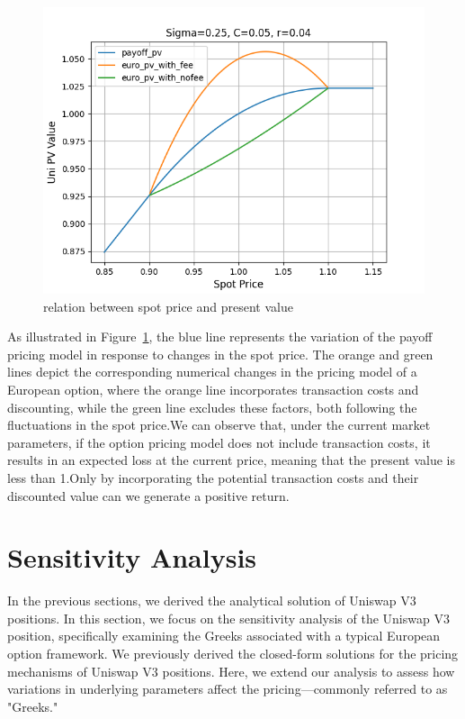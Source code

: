 \documentclass[conference]{IEEEtran}
\begin{document}
\begin{figure}
    \centering
    \includegraphics[width=1\linewidth]{figures/euro-pv-spot.png}
    \caption{relation between spot price and present value}
    \label{fig:spot_pv}
\end{figure}
As illustrated in Figure~\ref{fig:spot_pv}, the blue line represents the variation of the payoff pricing model in response to changes in the spot price. The orange and green lines depict the corresponding numerical changes in the pricing model of a European option, where the orange line incorporates transaction costs and discounting, while the green line excludes these factors, both following the fluctuations in the spot price.We can observe that, under the current market parameters, if the option pricing model does not include transaction costs, it results in an expected loss at the current price, meaning that the present value is less than 1.Only by incorporating the potential transaction costs and their discounted value can we generate a positive return.


\section{Sensitivity Analysis}
In the previous sections, we derived the analytical solution of Uniswap V3 positions. In this section, we focus on the sensitivity analysis of the Uniswap V3 position, specifically examining the Greeks associated with a typical European option framework. We previously derived the closed-form solutions for the pricing mechanisms of Uniswap V3 positions. Here, we extend our analysis to assess how variations in underlying parameters affect the pricing—commonly referred to as "Greeks."
\end{document}
